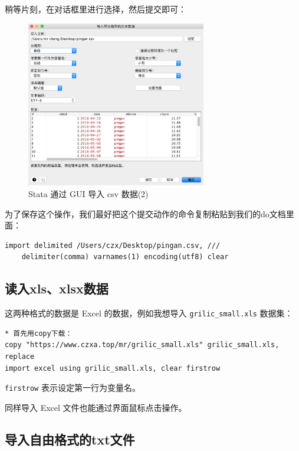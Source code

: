 稍等片刻，在对话框里进行选择，然后提交即可：

\begin{figure}[htbp]
  \centering \includegraphics[width=0.7\textwidth]{assets/csvgui2.png}
  \caption{Stata 通过 GUI 导入 csv 数据(2)}
  \label{fig:csvgui2}
\end{figure}

为了保存这个操作，我们最好把这个提交动作的命令复制粘贴到我们的do文档里面：

\begin{lstlisting}
import delimited /Users/czx/Desktop/pingan.csv, ///
    delimiter(comma) varnames(1) encoding(utf8) clear
\end{lstlisting}

\subsection{读入xls、xlsx数据}

这两种格式的数据是 Excel 的数据，例如我想导入 \texttt{grilic\_small.xls} 数据集：

\begin{lstlisting}
* 首先用copy下载：
copy "https://www.czxa.top/mr/grilic_small.xls" grilic_small.xls, replace
import excel using grilic_small.xls, clear firstrow
\end{lstlisting}

\texttt{firstrow} 表示设定第一行为变量名。

同样导入 Excel 文件也能通过界面鼠标点击操作。

\subsection{导入自由格式的txt文件}

